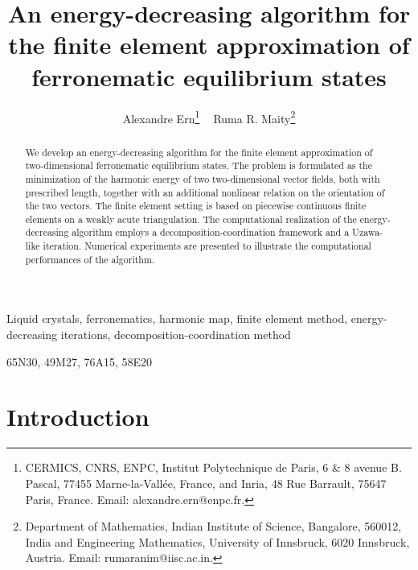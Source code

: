\documentclass[a4paper,11pt]{article}
\title{An energy-decreasing algorithm for the finite element approximation of ferronematic equilibrium states}
\theoremstyle{definition}
\theoremstyle{remark}
\numberwithin{equation}{section}
\begin{document}
\author{    Alexandre Ern\footnote{CERMICS, CNRS, ENPC, Institut Polytechnique de Paris, 6 \& 8 avenue B. Pascal, 77455 Marne-la-Vallée, France, and Inria, 48 Rue Barrault, 75647 Paris, France. Email: alexandre.ern@enpc.fr.}  $\;\;$    
Ruma R. Maity\footnote{Department of Mathematics, Indian Institute of Science, Bangalore, 560012, India and Engineering Mathematics, University of Innsbruck, 6020 Innsbruck, Austria. Email: rumaranim@iisc.ac.in.} 
}
\maketitle


\begin{abstract}
We develop an energy-decreasing algorithm for the finite element approximation of two-dimensional ferronematic equilibrium states. The problem is formulated as the minimization of the harmonic energy of two two-dimensional vector fields, both with prescribed length, together with an additional nonlinear relation on the orientation of the two vectors. The finite element setting is based on piecewise continuous finite elements on a weakly acute triangulation. The computational realization of the energy-decreasing algorithm employs a decomposition-coordination framework and a Uzawa-like iteration. Numerical experiments are presented to illustrate the computational performances of the algorithm.
\end{abstract}

 Liquid crystals, ferronematics, harmonic map, finite element method, energy-decreasing iterations, decomposition-coordination method

\medskip

 65N30, 49M27, 76A15, 58E20



\section{Introduction}
\end{document}
